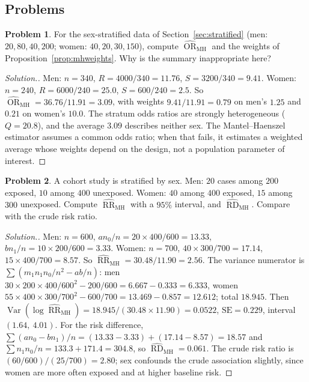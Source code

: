 \documentclass[11pt,a4paper]{article}
\numberwithin{equation}{section}
\DeclareMathOperator{\Var}{Var}
\DeclareMathOperator{\OR}{OR}
\DeclareMathOperator{\RR}{RR}
\DeclareMathOperator{\RD}{RD}
\theoremstyle{definition}
\newtheorem{problemx}{Problem}[subsection]
\newenvironment{problem}{\begin{problemx}}{\end{problemx}}
\newenvironment{solution}
  {\renewcommand{\qedsymbol}{}\begin{proof}[\textit{Solution}.]}
  {\end{proof}}
\begin{document}
\subsection{Problems}

\begin{problem}
For the sex-stratified data of Section~\ref{sec:stratified} (men: $20, 80, 40, 200$; women: $40, 20, 30, 150$), compute $\widehat{\OR}_{\text{MH}}$ and the weights of
Proposition~\ref{prop:mhweights}. Why is the summary inappropriate here?
\end{problem}

\begin{solution}
Men: $n = 340$, $R = 4000/340 = 11.76$, $S = 3200/340 = 9.41$. Women: $n = 240$, $R = 6000/240 = 25.0$, $S = 600/240 = 2.5$. So $\widehat{\OR}_{\text{MH}} = 36.76/11.91 = 3.09$, with weights
$9.41/11.91 = 0.79$ on men's $1.25$ and $0.21$ on women's $10.0$. The stratum odds ratios are strongly heterogeneous ($Q = 20.8$), and the average $3.09$
describes neither sex. The Mantel--Haenszel estimator assumes a common odds ratio; when that fails, it estimates a weighted average whose
weights depend on the design, not a population parameter of interest.
\end{solution}

\begin{problem}
A cohort study is stratified by sex. Men: $20$ cases among $200$ exposed, $10$ among $400$ unexposed. Women: $40$ among $400$ exposed, $15$ among $300$
unexposed. Compute $\widehat{\RR}_{\text{MH}}$ with a $95\%$ interval, and $\widehat{\RD}_{\text{MH}}$. Compare with the crude risk ratio.
\end{problem}

\begin{solution}
Men: $n = 600$, $a n_0/n = 20 \times 400/600 = 13.33$, $b n_1/n = 10 \times 200/600 = 3.33$. Women: $n = 700$, $40 \times 300/700 = 17.14$, $15 \times 400/700 = 8.57$. So
$\widehat{\RR}_{\text{MH}} = 30.48/11.90 = 2.56$. The variance numerator is $\sum (m_1 n_1 n_0/n^2 - ab/n)$: men $30 \times 200 \times 400/600^2 - 200/600 = 6.667 - 0.333 = 6.333$, women
$55 \times 400 \times 300/700^2 - 600/700 = 13.469 - 0.857 = 12.612$; total $18.945$. Then $\Var(\log\widehat{\RR}_{\text{MH}}) = 18.945/(30.48 \times 11.90) = 0.0522$, $\text{SE} = 0.229$,
interval $(1.64,\ 4.01)$. For the risk difference, $\sum(an_0 - bn_1)/n = (13.33 - 3.33) + (17.14 - 8.57) = 18.57$ and $\sum n_1 n_0/n = 133.3 + 171.4 = 304.8$, so $\widehat{\RD}_{\text{MH}} = 0.061$.
The crude risk ratio is $(60/600)/(25/700) = 2.80$; sex confounds the crude association slightly, since women are more often exposed and
at higher baseline risk.
\end{solution}
\end{document}
